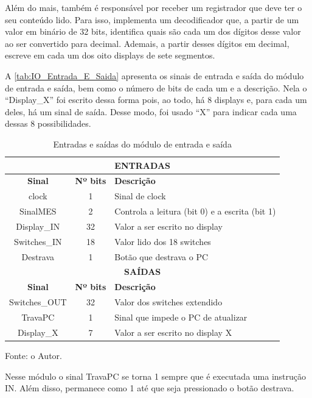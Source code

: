 \documentclass[
	12pt,				%
	oneside,
	a4paper,			%
	english,			%
	french,				%
	spanish,			%
	brazil,				%
	]{abntex2}
\begin{document}
Além do mais, também é responsável por receber um registrador que deve ter o seu conteúdo lido. Para isso, implementa um decodificador que, a partir de um valor em binário de 32 bits, identifica quais são cada um dos dígitos desse valor ao ser convertido para decimal. Ademais, a partir desses dígitos em decimal, escreve em cada um dos oito displays de sete segmentos.

A \autoref{tab:IO_Entrada_E_Saida} apresenta os sinais de entrada e saída do módulo de entrada e saída, bem como o número de bits de cada um e a descrição. Nela o ``Display\_X'' foi escrito dessa forma pois, ao todo, há 8 displays e, para cada um deles, há um sinal de saída. Desse modo, foi usado ``X'' para indicar cada uma dessas 8 possibilidades.

\setlength{\tabcolsep}{10pt} %
\begin{table}[H]
\centering
\caption{Entradas e saídas do módulo de entrada e saída}
\label{tab:IO_Entrada_E_Saida}
\begin{tabular}{|c|c|l|}
\hline
\multicolumn{3}{|c|}{\textbf{ENTRADAS}} \\
\hline
\textbf{Sinal} & \textbf{Nº bits} & \textbf{Descrição} \\
\hline
clock & 1 & Sinal de clock \\
\hline
SinalMES & 2 & Controla a leitura (bit 0) e a escrita (bit 1)\\
\hline
Display\_IN & 32 & Valor a ser escrito no display \\
\hline
Switches\_IN & 18 & Valor lido dos 18 switches\\
\hline
Destrava & 1 & Botão que destrava o PC \\
\hline
\multicolumn{3}{|c|}{\textbf{SAÍDAS}} \\
\hline
\textbf{Sinal} & \textbf{Nº bits} & \textbf{Descrição} \\
\hline
Switches\_OUT & 32 & Valor dos switches extendido \\
\hline
TravaPC & 1 & Sinal que impede o PC de atualizar \\
\hline
Display\_X & 7 & Valor a ser escrito no display X \\
\hline
\end{tabular}
\vspace{-0.5em}
\begin{center}
Fonte: o Autor.
\end{center}
\end{table} 

Nesse módulo o sinal TravaPC se torna 1 sempre que é executada uma instrução IN. Além disso, permanece como 1 até que seja pressionado o botão destrava.
\end{document}
